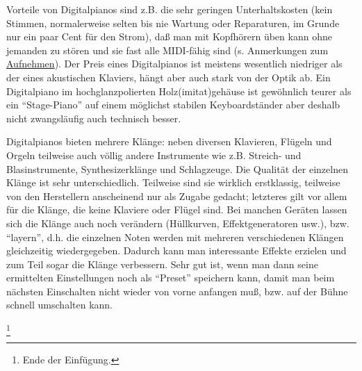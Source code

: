 Vorteile von Digitalpianos sind z.B. die sehr geringen Unterhaltskosten (kein Stimmen, normalerweise selten bis nie Wartung oder Reparaturen, im Grunde nur ein paar Cent für den Strom), daß man mit Kopfhörern üben kann ohne jemanden zu stören und sie fast alle MIDI-fähig sind (s. Anmerkungen zum \hyperlink{c1iii13MIDI}{Aufnehmen}).
Der Preis eines Digitalpianos ist meistens wesentlich niedriger als der eines akustischen Klaviers, hängt aber auch stark von der Optik ab.
Ein Digitalpiano im hochglanzpolierten Holz(imitat)gehäuse ist gewöhnlich teurer als ein \enquote{Stage-Piano} auf einem möglichst stabilen Keyboardständer aber deshalb nicht zwangsläufig auch technisch besser.

Digitalpianos bieten mehrere Klänge: neben diversen Klavieren, Flügeln und Orgeln teilweise auch völlig andere Instrumente wie z.B. Streich- und Blasinstrumente, Synthesizerklänge und Schlagzeuge.
Die Qualität der einzelnen Klänge ist sehr unterschiedlich.
Teilweise sind sie wirklich erstklassig, teilweise von den Herstellern anscheinend nur als Zugabe gedacht; letzteres gilt vor allem für die Klänge, die keine Klaviere oder Flügel sind.
Bei manchen Geräten lassen sich die Klänge auch noch verändern (Hüllkurven, Effektgeneratoren usw.), bzw. \enquote{layern}, d.h. die einzelnen Noten werden mit mehreren verschiedenen Klängen gleichzeitig wiedergegeben.
Dadurch kann man interessante Effekte erzielen und zum Teil sogar die Klänge verbessern.
Sehr gut ist, wenn man dann seine ermittelten Einstellungen noch als \enquote{Preset} speichern kann, damit man beim nächsten Einschalten nicht wieder von vorne anfangen muß, bzw. auf der Bühne schnell umschalten kann.


\footnote{Ende der Einfügung.}




